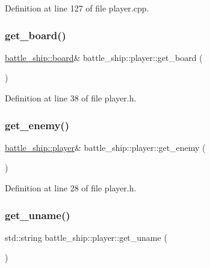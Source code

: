 Definition at line 127 of file player.\+cpp.

\mbox{\label{classbattle__ship_1_1player_a8b896d17e51345a138ba997903b347f1}} 
\subsubsection{\texorpdfstring{get\+\_\+board()}{get\_board()}}
{\footnotesize\ttfamily \hyperlink{classbattle__ship_1_1board}{battle\+\_\+ship\+::board}\& battle\+\_\+ship\+::player\+::get\+\_\+board (\begin{DoxyParamCaption}{ }\end{DoxyParamCaption})\hspace{0.3cm}{\ttfamily [inline]}}



Definition at line 38 of file player.\+h.

\mbox{\label{classbattle__ship_1_1player_a62535f933925992eb689c2a5c2b99dd6}} 
\subsubsection{\texorpdfstring{get\+\_\+enemy()}{get\_enemy()}}
{\footnotesize\ttfamily \hyperlink{classbattle__ship_1_1player}{battle\+\_\+ship\+::player}\& battle\+\_\+ship\+::player\+::get\+\_\+enemy (\begin{DoxyParamCaption}{ }\end{DoxyParamCaption})\hspace{0.3cm}{\ttfamily [inline]}}



Definition at line 28 of file player.\+h.

\mbox{\label{classbattle__ship_1_1player_a4a5406b436812664cb706c31b745239b}} 
\subsubsection{\texorpdfstring{get\+\_\+uname()}{get\_uname()}}
{\footnotesize\ttfamily std\+::string battle\+\_\+ship\+::player\+::get\+\_\+uname (\begin{DoxyParamCaption}{ }\end{DoxyParamCaption})\hspace{0.3cm}{\ttfamily [inline]}}



